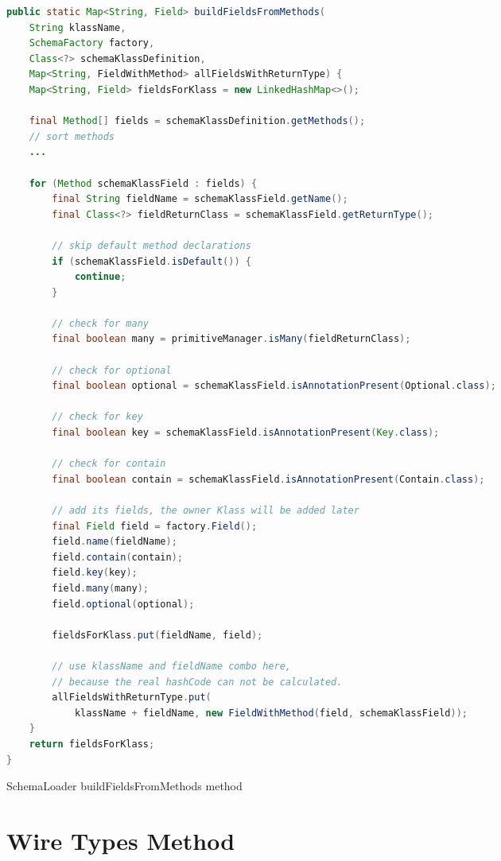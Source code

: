 \begin{sourcecode} [H]
	\begin{lstlisting}[language=Java, escapechar=|]
public static Map<String, Field> buildFieldsFromMethods(
	String klassName,
	SchemaFactory factory,
	Class<?> schemaKlassDefinition,
	Map<String, FieldWithMethod> allFieldsWithReturnType) {
	Map<String, Field> fieldsForKlass = new LinkedHashMap<>();

	final Method[] fields = schemaKlassDefinition.getMethods();
	// sort methods
	...

	for (Method schemaKlassField : fields) {
		final String fieldName = schemaKlassField.getName();
		final Class<?> fieldReturnClass = schemaKlassField.getReturnType();

		// skip default method declarations
		if (schemaKlassField.isDefault()) {
			continue;
		}

		// check for many
		final boolean many = primitiveManager.isMany(fieldReturnClass);

		// check for optional
		final boolean optional = schemaKlassField.isAnnotationPresent(Optional.class);

		// check for key
		final boolean key = schemaKlassField.isAnnotationPresent(Key.class);

		// check for contain
		final boolean contain = schemaKlassField.isAnnotationPresent(Contain.class);

		// add its fields, the owner Klass will be added later
		final Field field = factory.Field();
		field.name(fieldName);
		field.contain(contain);
		field.key(key);
		field.many(many);
		field.optional(optional);

		fieldsForKlass.put(fieldName, field);

		// use klassName and fieldName combo here, 
		// because the real hashCode can not be calculated.
		allFieldsWithReturnType.put(
			klassName + fieldName, new FieldWithMethod(field, schemaKlassField));
	}
	return fieldsForKlass;
}
    \end{lstlisting}
	\caption{SchemaLoader buildFieldsFromMethods method}
	\label{lst:SchemaLoader_buildFieldsFromMethods}
\end{sourcecode}

\section{Wire Types Method}

